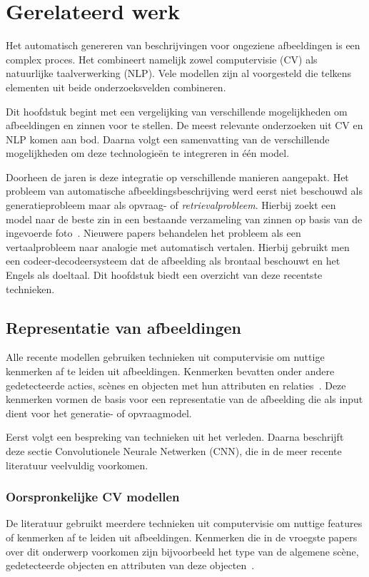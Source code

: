 \chapter{Gerelateerd werk}
\label{hoofdstuk:related}
Het automatisch genereren van beschrijvingen voor ongeziene afbeeldingen is een complex proces. Het combineert namelijk zowel computervisie (CV) als natuurlijke taalverwerking (NLP). Vele modellen zijn al voorgesteld die telkens elementen uit beide onderzoeksvelden combineren. 

Dit hoofdstuk begint met een vergelijking van verschillende mogelijkheden om afbeeldingen en zinnen voor te stellen. De meest relevante onderzoeken uit CV en NLP komen aan bod. Daarna volgt een samenvatting van de verschillende mogelijkheden om deze technologie\"en te integreren in \'e\'en model. 

Doorheen de jaren is deze integratie op verschillende manieren aangepakt. Het probleem van automatische afbeeldingsbeschrijving werd eerst niet beschouwd als generatieprobleem maar als opvraag- of \emph{retrievalprobleem}. Hierbij zoekt een model naar de beste zin in een bestaande verzameling van zinnen op basis van de ingevoerde foto~\cite{Hodosh2013}. Nieuwere papers behandelen het probleem als een vertaalprobleem naar analogie met automatisch vertalen. Hierbij gebruikt men een codeer-decodeersysteem dat de afbeelding als brontaal beschouwt en het Engels als doeltaal. Dit hoofdstuk biedt een overzicht van deze recentste technieken.

\section{Representatie van afbeeldingen}
Alle recente modellen gebruiken technieken uit computervisie om nuttige kenmerken af te leiden uit afbeeldingen. Kenmerken bevatten onder andere gedetecteerde acties, sc\`enes en objecten met hun attributen en relaties~\cite{Bernardi}. Deze kenmerken vormen de basis voor een representatie van de afbeelding die als input dient voor het generatie- of opvraagmodel.

Eerst volgt een bespreking van technieken uit het verleden. Daarna beschrijft deze sectie Convolutionele Neurale Netwerken (CNN), die in de meer recente literatuur veelvuldig voorkomen.


\subsection{Oorspronkelijke CV modellen}
De literatuur gebruikt meerdere technieken uit computervisie om nuttige features of kenmerken af te leiden uit afbeeldingen. Kenmerken die in de vroegste papers over dit onderwerp voorkomen zijn bijvoorbeeld het type van de algemene sc\`ene, gedetecteerde objecten en attributen van deze objecten~\cite{Farhadi2010,Patterson2014,Yang2011}.

